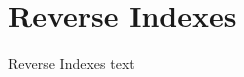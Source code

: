

\section{Reverse Indexes}\fbeg{}\begin{frame}{}

{\fontsize{20}{23}\selectfont

Reverse Indexes text

}

\end{frame}



